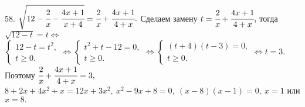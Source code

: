 58. $\sqrt{12-\cfrac{2}{x}-\cfrac{4x+1}{x+4}}=\cfrac{2}{x}+\cfrac{4x+1}{4+x}.$ Сделаем замену $t=\cfrac{2}{x}+\cfrac{4x+1}{4+x},$ тогда $\sqrt{12-t}=t\Leftrightarrow$\\$ \begin{cases} 12-t=t^2,\\ t\geqslant0.\end{cases}\Leftrightarrow \begin{cases} t^2+t-12=0,\\ t\geqslant0.\end{cases}
\Leftrightarrow \begin{cases} (t+4)(t-3)=0,\\ t\geqslant0.\end{cases}\Leftrightarrow t=3.$ Поэтому $\cfrac{2}{x}+\cfrac{4x+1}{4+x}=3,$\\$
8+2x+4x^2+x=12x+3x^2,\ x^2-9x+8=0,\ (x-8)(x-1)=0,\ x=1$ или $x=8.$\\
